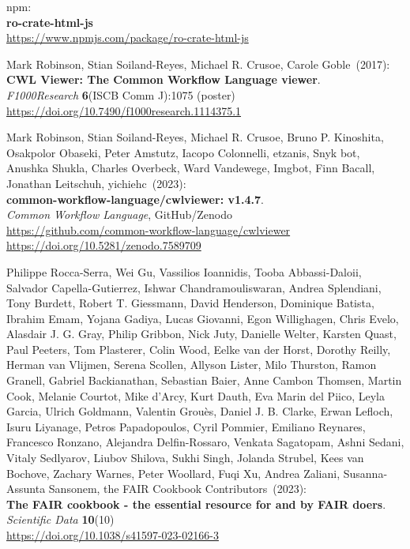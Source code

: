 \begin{thebibliography}{9}
npm:\\
\textbf{ro-crate-html-js}\\
\url{https://www.npmjs.com/package/ro-crate-html-js}

Mark Robinson, Stian Soiland-Reyes, Michael R. Crusoe, Carole Goble~(2017): \\
\textbf{CWL Viewer: The Common Workflow Language viewer}.\\
\emph{F1000Research} \textbf{6}(ISCB Comm J):1075 (poster)\\
\url{https://doi.org/10.7490/f1000research.1114375.1} 

Mark Robinson, Stian Soiland-Reyes, Michael R. Crusoe, Bruno P. Kinoshita, Osakpolor Obaseki, Peter Amstutz, Iacopo Colonnelli, etzanis, Snyk bot, Anushka Shukla, Charles Overbeck, Ward Vandewege, Imgbot, Finn Bacall, Jonathan Leitschuh, yichiehc~(2023): \\
\textbf{common-workflow-language/cwlviewer: v1.4.7}.\\
\emph{Common Workflow Language}, GitHub/Zenodo\\
\url{https://github.com/common-workflow-language/cwlviewer}\\
\url{https://doi.org/10.5281/zenodo.7589709}

Philippe Rocca-Serra, Wei Gu, Vassilios Ioannidis, Tooba Abbassi-Daloii,
Salvador Capella-Gutierrez, Ishwar Chandramouliswaran, Andrea
Splendiani, Tony Burdett, Robert T. Giessmann, David Henderson,
Dominique Batista, Ibrahim Emam, Yojana Gadiya, Lucas Giovanni, Egon
Willighagen, Chris Evelo, Alasdair J. G. Gray, Philip Gribbon, Nick
Juty, Danielle Welter, Karsten Quast, Paul Peeters, Tom Plasterer, Colin
Wood, Eelke van der Horst, Dorothy Reilly, Herman van Vlijmen, Serena
Scollen, Allyson Lister, Milo Thurston, Ramon Granell, Gabriel
Backianathan, Sebastian Baier, Anne Cambon Thomsen, Martin Cook, Melanie
Courtot, Mike d'Arcy, Kurt Dauth, Eva Marin del Piico, Leyla Garcia,
Ulrich Goldmann, Valentin Grouès, Daniel J. B. Clarke, Erwan Lefloch,
Isuru Liyanage, Petros Papadopoulos, Cyril Pommier, Emiliano Reynares,
Francesco Ronzano, Alejandra Delfin-Rossaro, Venkata Sagatopam, Ashni
Sedani, Vitaly Sedlyarov, Liubov Shilova, Sukhi Singh, Jolanda Strubel,
Kees van Bochove, Zachary Warnes, Peter Woollard, Fuqi Xu, Andrea
Zaliani, Susanna-Assunta Sansonem, the FAIR Cookbook Contributors~(2023): \\
\textbf{The {FAIR} cookbook - the essential resource for and by {FAIR} doers}.\\
\emph{Scientific Data} \textbf{10}(10)\\
\url{https://doi.org/10.1038/s41597-023-02166-3}


\end{thebibliography}
